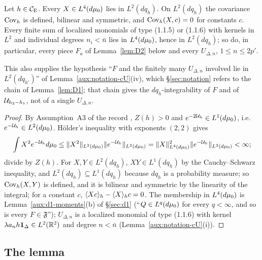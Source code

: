 \begin{auxlemma}\label{aux:d2-int}
Let $h\in\mathcal{C}_{\mathrm E}$.  Every $X\in L^4(d\mu_0)$ lies in $L^2(dq_h)$.  On $L^2(dq_h)$ the covariance
$\operatorname{Cov}_h$ is defined, bilinear and symmetric, and $\operatorname{Cov}_h(X,c)=0$ for constants $c$.  Every finite
sum of localized monomials of type (1.1.5) or (1.1.6) with kernels in $L^2$ and individual degrees
$n_i<\bar n$ lies in $L^4(d\mu_0)$, hence in $L^2(dq_h)$; so do, in particular, every piece $F_a$
of Lemma~\ref{lem:D2} below and every $U_{\Delta,n}$, $1\le n\le2p'$.
\end{auxlemma}

This also supplies the hypothesis ``$F$ and the finitely many $U_{\Delta,n}$ involved lie in
$L^2(dq_{h'})$'' of Lemma~\ref{aux:notation-cU}(iv), which \S\ref{sec:notation} refers to the
chain of Lemma~\ref{lem:D1}; that chain gives the $dq_h$-integrability of $F$ and of
$\mathcal U_{h_2-h_1}$, not of a single $U_{\Delta,n}$.

\begin{proof}
By Assumption~A3 of the record \cite[p.~8]{R}, $Z(h)>0$ and $e^{-2\mathcal U_h}\in L^1(d\mu_0)$, i.e.\
$e^{-\mathcal U_h}\in L^2(d\mu_0)$.  H\"older's inequality with exponents $(2,2)$ gives
\[
 \int X^2e^{-\mathcal U_h}d\mu_0\le\|X^2\|_{L^2(d\mu_0)}\|e^{-\mathcal U_h}\|_{L^2(d\mu_0)}
 =\|X\|_{L^4(d\mu_0)}^2\|e^{-\mathcal U_h}\|_{L^2(d\mu_0)}<\infty ;
\]
divide by $Z(h)$.  For $X,Y\in L^2(dq_h)$, $XY\in L^1(dq_h)$
by the Cauchy--Schwarz inequality, and $L^2(dq_h)\subseteq L^1(dq_h)$ because $dq_h$ is a
probability measure; so $\operatorname{Cov}_h(X,Y)$ is defined, and it is bilinear and symmetric by the
linearity of the integral; for a constant $c$, $\langle Xc\rangle_{h}-\langle X\rangle_{h}c=0$.  The membership in
$L^4(d\mu_0)$ is Lemma~\ref{aux:d1-moments}(b) of \S\ref{sec:d1} (``$Q\in L^q(d\mu_0)$ for every
$q<\infty$, and so is every $F\in\mathfrak F$''); $U_{\Delta,n}$ is a localized monomial of type
(1.1.6) with kernel $\lambda a_nh\mathbf 1_\Delta\in L^2(\mathbb{R}^2)$ and degree $n<\bar n$
(Lemma~\ref{aux:notation-cU}(i)).
\end{proof}

\subsection{The lemma}\label{sub:d2-lemma}

